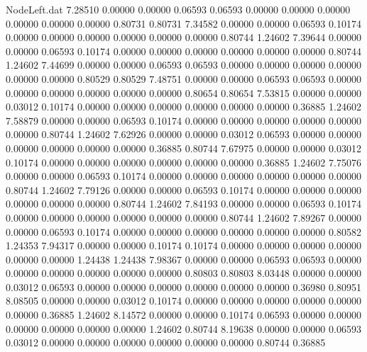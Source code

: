 \begin{filecontents}{NodeLeft.dat}
   7.28510    0.00000    0.00000     0.06593    0.06593    0.00000    0.00000    0.00000    0.00000    0.00000    0.00000    0.80731    0.80731
   7.34582    0.00000    0.00000     0.06593    0.10174    0.00000    0.00000    0.00000    0.00000    0.00000    0.00000    0.80744    1.24602
   7.39644    0.00000    0.00000     0.06593    0.10174    0.00000    0.00000    0.00000    0.00000    0.00000    0.00000    0.80744    1.24602
   7.44699    0.00000    0.00000     0.06593    0.06593    0.00000    0.00000    0.00000    0.00000    0.00000    0.00000    0.80529    0.80529
   7.48751    0.00000    0.00000     0.06593    0.06593    0.00000    0.00000    0.00000    0.00000    0.00000    0.00000    0.80654    0.80654
   7.53815    0.00000    0.00000     0.03012    0.10174    0.00000    0.00000    0.00000    0.00000    0.00000    0.00000    0.36885    1.24602
   7.58879    0.00000    0.00000     0.06593    0.10174    0.00000    0.00000    0.00000    0.00000    0.00000    0.00000    0.80744    1.24602
   7.62926    0.00000    0.00000     0.03012    0.06593    0.00000    0.00000    0.00000    0.00000    0.00000    0.00000    0.36885    0.80744
   7.67975    0.00000    0.00000     0.03012    0.10174    0.00000    0.00000    0.00000    0.00000    0.00000    0.00000    0.36885    1.24602
   7.75076    0.00000    0.00000     0.06593    0.10174    0.00000    0.00000    0.00000    0.00000    0.00000    0.00000    0.80744    1.24602
   7.79126    0.00000    0.00000     0.06593    0.10174    0.00000    0.00000    0.00000    0.00000    0.00000    0.00000    0.80744    1.24602
   7.84193    0.00000    0.00000     0.06593    0.10174    0.00000    0.00000    0.00000    0.00000    0.00000    0.00000    0.80744    1.24602
   7.89267    0.00000    0.00000     0.06593    0.10174    0.00000    0.00000    0.00000    0.00000    0.00000    0.00000    0.80582    1.24353
   7.94317    0.00000    0.00000     0.10174    0.10174    0.00000    0.00000    0.00000    0.00000    0.00000    0.00000    1.24438    1.24438
   7.98367    0.00000    0.00000     0.06593    0.06593    0.00000    0.00000    0.00000    0.00000    0.00000    0.00000    0.80803    0.80803
   8.03448    0.00000    0.00000     0.03012    0.06593    0.00000    0.00000    0.00000    0.00000    0.00000    0.00000    0.36980    0.80951
   8.08505    0.00000    0.00000     0.03012    0.10174    0.00000    0.00000    0.00000    0.00000    0.00000    0.00000    0.36885    1.24602
   8.14572    0.00000    0.00000     0.10174    0.06593    0.00000    0.00000    0.00000    0.00000    0.00000    0.00000    1.24602    0.80744
   8.19638    0.00000    0.00000     0.06593    0.03012    0.00000    0.00000    0.00000    0.00000    0.00000    0.00000    0.80744    0.36885

\end{filecontents}
